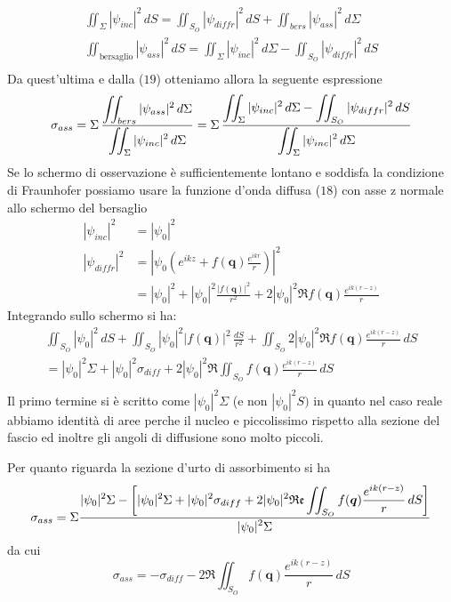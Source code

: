 \begin{gather*}
	\iint_{\Sigma} |\psi_{inc}|^2 \, dS =
	\iint_{S_O} |\psi_{diffr}|^2 \, dS +
	\iint_{bers} |\psi_{ass}|^2 \, d \Sigma\\
	\iint_{\text{bersaglio}} |\psi_{ass}|^2 \, dS =
	\iint_{\Sigma} |\psi_{inc}|^2 \, d\Sigma -
	\iint_{S_O} |\psi_{diffr}|^2 \, dS\\
\end{gather*} Da quest'ultima e dalla ($19$) otteniamo allora la seguente espressione \[
	\sigma_{ass} =\Sigma \, \fraclarg{\iint_{bers} |\psi_{ass}|^2 \, d \Sigma}{\iint_{\Sigma} |\psi_{inc}|^2 \, d \Sigma}
	= \Sigma \, \fraclarg{\iint_{\Sigma} |\psi_{inc}|^2 \, d\Sigma -
		\iint_{S_O} |\psi_{diffr}|^2 \, dS}{\iint_{\Sigma} |\psi_{inc}|^2 \, d \Sigma}
\] Se lo schermo di osservazione è sufficientemente lontano e soddisfa la condizione di Fraunhofer possiamo usare la funzione d'onda diffusa ($18$) con asse z normale allo schermo del bersaglio \begin{align*}
	|\psi_{inc}|^2   & = |\psi_0|^2                                                                                           \\
	|\psi_{diffr}|^2 & = \left | \psi_0 \left( e^{ikz} + f(\bm{q})\frac{e^{ikr}}{r} \right) \right|^2                         \\
	                 & =  |\psi_0|^2 + |\psi_0|^2 \frac{|f(\bm{q})|^2}{r^2} + 2 |\psi_0|^2 \Re f(\bm{q})\frac{e^{ik(r-z)}}{r}
\end{align*} Integrando sullo schermo si ha: \begin{gather*}
	\iint_{S_O} |\psi_0|^2 \, dS + \iint_{S_O}|\psi_0|^2 |f(\bm{q})|^2\, \frac{dS}{r^2} + \iint_{S_O}2 |\psi_0|^2 \Re f(\bm{q})\frac{e^{ik(r-z)}}{r} \, dS\\
	= |\psi_0|^2 \Sigma + |\psi_0|^2 \sigma_{diff} + 2 |\psi_0|^2 \Re \iint_{S_O} f(\bm{q})\frac{e^{ik(r-z)}}{r} \,dS\\
\end{gather*} Il primo termine si è scritto come $|\psi_0|^2 \Sigma$ (e non $|\psi_0|^2 S)$ in quanto nel caso reale abbiamo identità di aree perche il nucleo e piccolissimo rispetto alla sezione del fascio ed inoltre gli angoli di diffusione sono molto piccoli.

Per quanto riguarda la sezione d'urto di assorbimento si ha
\[
	\sigma_{ass} = \Sigma   \fraclarg{|\psi_0|^2 \Sigma - \left[ |\psi_0|^2 \Sigma + |\psi_0|^2 \sigma_{diff} +  2 |\psi_0|^2 \Re \iint_{S_O} f(\bm{q})\frac{e^{ik(r-z)}}{r} \,dS \right]}{|\psi_0|^2 \Sigma}
\] da cui
\begin{equation}
	\sigma_{ass} = - \sigma_{diff} -  2  \Re \iint_{S_O} f(\bm{q})\frac{e^{ik(r-z)}}{r} \,dS
\end{equation}

